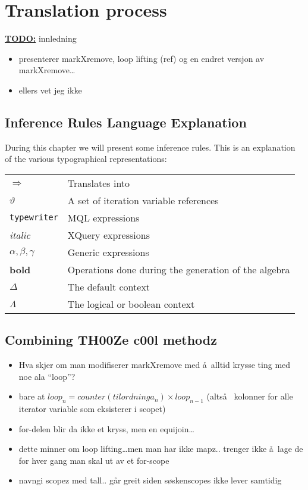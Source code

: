 \chapter{Translation process}


\textbf{\underline{\LARGE TODO:}} innledning
\begin{itemize}
  \item presenterer markXremove, loop lifting (ref) og en endret versjon av
  markXremove\ldots
  \item ellers vet jeg ikke
\end{itemize}


\section{Inference Rules Language Explanation}
\label{sect:translation:inferenceExplanation}
During this chapter we will present some inference rules. This is an explanation
of the various typographical representations:

\begin{tabular}{l|l}

  $\Longrightarrow$  & Translates into \\
  $\vartheta$ & A set of iteration variable references \\
  \texttt{typewriter} & MQL expressions \\
  \textit{italic} & XQuery expressions \\
  $\alpha , \beta, \gamma$ & Generic expressions \\
  \textbf{bold} & Operations done during the generation of the algebra \\
  $\Delta$ & The default context \\
  $\Lambda$ & The logical or boolean context \\
  
\end{tabular}








\section{Combining TH00Ze c00l methodz}
\begin{itemize}
  \item Hva skjer om man modifiserer markXremove med \aa~alltid krysse ting med
  noe ala ``loop''?
  \item bare at $loop_{n} = counter(tilordninga_{n}) \times loop_{n-1}$
  (alts\aa~ kolonner for alle iterator variable som eksisterer i scopet)
  \item for-delen blir da ikke et kryss, men en equijoin\ldots
  \item dette minner om loop lifting\ldots men man har ikke mapz.. trenger ikke
  \aa~lage de for hver gang man skal ut av et for-scope
  \item navngi scopez med tall.. g\aa r greit siden s\o skenscopes ikke lever
  samtidig
\end{itemize}

